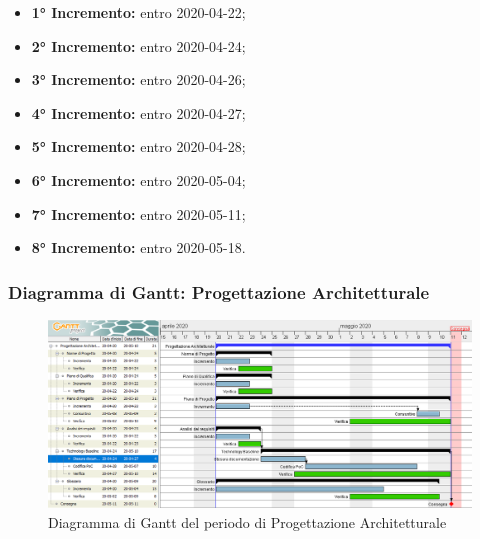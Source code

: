 			\begin{itemize}
				\item \textbf{1° Incremento:} entro 2020-04-22;
				\item \textbf{2° Incremento:} entro 2020-04-24;
				\item \textbf{3° Incremento:} entro 2020-04-26;
				\item \textbf{4° Incremento:} entro 2020-04-27;
				\item \textbf{5° Incremento:} entro 2020-04-28; %
				\item \textbf{6° Incremento:} entro 2020-05-04;
				\item \textbf{7° Incremento:} entro 2020-05-11;
				\item \textbf{8° Incremento:} entro 2020-05-18.
			\end{itemize}

	\subsubsection{Diagramma di Gantt: Progettazione Architetturale}
		\begin{figure}[h]
			\centering
			\includegraphics[width=1.1\textwidth]{./res/img/DiagrammiGantt/prog_arch_gantt.png}
			\caption{Diagramma di Gantt del periodo di Progettazione Architetturale}
		\end{figure}
\newpage
